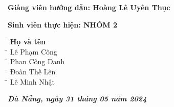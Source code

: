 \documentclass[a4paper]{article}
\begin{document}
\begin{titlepage}
\vspace{50pt}
\begin{addmargin}[1cm]{0cm}
\textbf{Giảng viên hướng dẫn: \hspace{2cm}Hoàng Lê Uyên Thục}
\end{addmargin}
\vspace{10pt}
\begin{addmargin}[1cm]{0cm}
\textbf{Sinh viên thực hiện: \hspace{2.6cm}NHÓM 2}
\begin{tabbing}
\hspace{6cm}\=\hspace{3cm}\=\hspace{3cm} \kill
{\textbf{Họ và tên}}\\
\hspace{6cm}\=\hspace{3cm}\=\hspace{3cm} \kill
Lê Phạm Công\\
\hspace{6cm}\=\hspace{3cm}\=\hspace{3cm} \kill
Phan Công Danh\\
\hspace{6cm}\=\hspace{3cm}\=\hspace{3cm} \kill
Đoàn Thế Lên\\
\hspace{6cm}\=\hspace{3cm}\=\hspace{3cm} \kill
Lê Minh Nhật\\
\end{tabbing}
\end{addmargin}
\vspace{1cm}
\begin{center}
    \textit{\textbf{Đà Nẵng, ngày 31 tháng 05 năm 2024}}
\end{center}
\end{titlepage}
\newpage
\tableofcontents
\newpage

\end{document}
